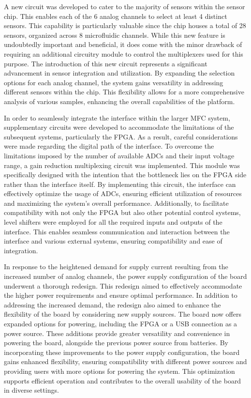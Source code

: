 A new circuit was developed to cater to the majority of sensors within the sensor chip. This enables each of the 6 analog channels to select at least 4 distinct sensors. This capability is particularly valuable since the chip houses a total of 28 sensors, organized across 8 microfluidic channels. While this new feature is undoubtedly important and beneficial, it does come with the minor drawback of requiring an additional circuitry module to control the multiplexers used for this purpose. The introduction of this new circuit represents a significant advancement in sensor integration and utilization. By expanding the selection options for each analog channel, the system gains versatility in addressing different sensors within the chip. This flexibility allows for a more comprehensive analysis of various samples, enhancing the overall capabilities of the platform. 

In order to seamlessly integrate the interface within the larger \ac{MFC} system, supplementary circuits were developed to accommodate the limitations of the subsequent systems, particularly the \ac{FPGA}. As a result, careful considerations were made regarding the digital path of the interface. To overcome the limitations imposed by the number of available \ac{ADC}s and their input voltage range, a gain reduction multiplexing circuit was implemented. This module was specifically designed with the intention that the bottleneck lies on the \ac{FPGA} side rather than the interface itself. By implementing this circuit, the interface can effectively optimize the usage of \ac{ADC}s, ensuring efficient utilization of resources and maximizing the system's overall performance. Additionally, to facilitate compatibility with not only the \ac{FPGA} but also other potential control systems, level shifters were employed for all the required inputs and outputs of the interface. This enables seamless communication and interaction between the interface and various external systems, ensuring compatibility and ease of integration.

In response to the heightened demand for supply current resulting from the increased number of analog channels, the power supply configuration of the board underwent a thorough redesign. This redesign aimed to effectively accommodate the higher power requirements and ensure optimal performance. In addition to addressing the increased demand, the redesign also aimed to enhance the flexibility of the board by considering new supply sources. The board now offers expanded options for powering, including the \ac{FPGA} or a USB connection as a power source. These additions provide greater versatility and convenience in powering the board, alongside the previous power source from batteries. By incorporating these improvements to the power supply configuration, the board gains enhanced flexibility, ensuring compatibility with different power sources and providing users with more options for powering the system. This optimization supports efficient operation and contributes to the overall usability of the board in diverse settings.

